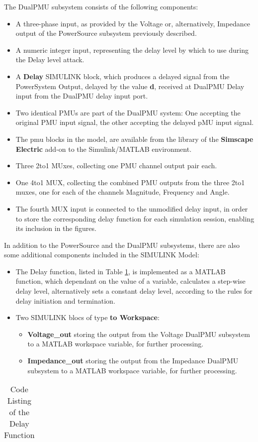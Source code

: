 The DualPMU subsystem consists of the following components:
\begin{itemize}
    \item A three-phase input, as provided by the Voltage or, alternatively, Impedance output of the PowerSource subsystem previously described.
    \item A numeric integer input, representing the delay level by which to use during the Delay level attack.
    \item A \textbf{Delay} SIMULINK block, which produces a delayed signal from the PowerSystem Output, delayed by the value \textbf{d}, received at DualPMU Delay input from the DualPMU delay input port.
    \item Two identical PMUs are part of the DualPMU system: One accepting the original PMU input signal, the other accepting the delayed pMU input signal. 
    \item The \acrshort{pmu} blocks in the model,  are available from the library of the \textbf{Simscape Electric} add-on to the Simulink/MATLAB environment.
    \item Three 2to1 MUxes, collecting one PMU channel output pair each.
    \item One 4to1  MUX, collecting the combined PMU outputs from the three 2to1 muxes, one for each of the channels Magnitude, Frequency and Angle. 
    \item The fourth MUX input is connected to the unmodified delay input, in order to store the corresponding delay function for each simulation session, enabling its inclusion in the figures.
\end{itemize}  
In addition to the PowerSource and the DualPMU subsystems, there are also some additional components included in the SIMULINK Model: 
\begin{itemize}
    \item The Delay function, listed in Table \ref{tab:vDelay}, is implemented as a MATLAB function, which dependant on the value of a variable, calculates a step-wise delay level, alternatively sets a constant delay level, according to the rules for delay initiation and termination.
    \item Two SIMULINK blocs of type \textbf{to Workspace}:
    \begin{itemize}
        \item \textbf{Voltage\_out} storing the output from the Voltage DualPMU subsystem to a MATLAB workspace variable, for further processing.
        \item \textbf{Impedance\_out} storing the output from the Impedance DualPMU subsystem to a MATLAB workspace variable, for further processing.
    \end{itemize}
\end{itemize}
\begin{table}[t]
    \centering
    \begin{tabular}{c}
           
    \end{tabular}
    \caption{Code Listing of the Delay Function}
    \label{tab:vDelay}
\end{table}
